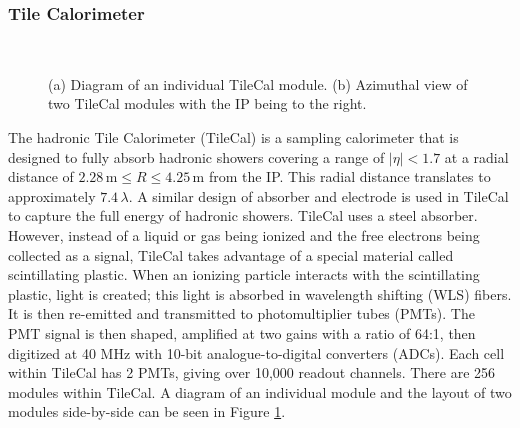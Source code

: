 		\subsubsection{Tile Calorimeter}\label{sssec:Tile}
		\begin{figure}[!ht]
		\centering
		 \\
		\caption{\label{fig:tile-modules} (a) Diagram of an individual TileCal module. (b) Azimuthal view of two TileCal modules with the IP being to the right.}
		\end{figure}
		The hadronic Tile Calorimeter (TileCal) is a sampling calorimeter that is designed to fully absorb hadronic showers covering a range of $|\eta|<1.7$ at a radial distance of $2.28 \, \mathrm{m} \leq R \leq 4.25 \, \mathrm{m}$ from the IP. This radial distance translates to approximately $7.4\, \lambda$. A similar design of absorber and electrode is used in TileCal to capture the full energy of hadronic showers. TileCal uses a steel absorber. However, instead of a liquid or gas being ionized and the free electrons being collected as a signal, TileCal takes advantage of a special material called scintillating plastic. When an ionizing particle interacts with the scintillating plastic, light is created; this light is absorbed in wavelength shifting (WLS) fibers. It is then re-emitted and transmitted to photomultiplier tubes (PMTs). The PMT signal is then shaped, amplified at two gains with a ratio of 64:1, then digitized at 40 MHz with 10-bit analogue-to-digital converters (ADCs). Each cell within TileCal has 2 PMTs, giving over 10,000 readout channels. There are 256 modules within TileCal. A diagram of an individual module and the layout of two modules side-by-side can be seen in Figure \ref{fig:tile-modules}.
		

